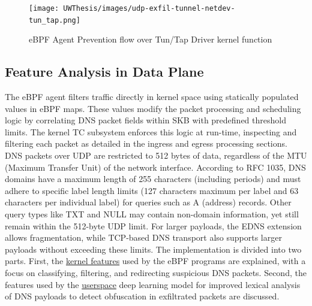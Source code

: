 \documentclass [11pt, proquest] {uwthesis}[2020/02/24]
\begin{document}
\begin{figure}[H]
\texttt{[image: UWThesis/images/udp-exfil-tunnel-netdev-tun\_tap.png]}
\caption{eBPF Agent Prevention flow over Tun/Tap Driver kernel function}
\label{sec:data_plane_tunnel_netdev}
\end{figure}



\subsection{Feature Analysis in Data Plane}
\label{sec:features}
The eBPF agent filters traffic directly in kernel space using statically populated values in eBPF maps. These values modify the packet processing and scheduling logic by correlating DNS packet fields within SKB with predefined threshold limits. The kernel TC subsystem enforces this logic at run-time, inspecting and filtering each packet as detailed in the ingress and egress processing sections. DNS packets over UDP are restricted to 512 bytes of data, regardless of the MTU (Maximum Transfer Unit) of the network interface. According to RFC 1035, DNS domains have a maximum length of 255 characters (including periods) and must adhere to specific label length limits (127 characters maximum per label and 63 characters per individual label) for queries such as A (address) records. Other query types like TXT and NULL may contain non-domain information, yet still remain within the 512-byte UDP limit. For larger payloads, the EDNS extension allows fragmentation, while TCP-based DNS transport also supports larger payloads without exceeding these limits. The implementation is divided into two parts. First, the \hyperref[sec:kernel-features]{kernel features} used by the eBPF programs are explained, with a focus on classifying, filtering, and redirecting suspicious DNS packets. Second, the features used by the \hyperref[sec:userspace-features]{userspace} deep learning model for improved lexical analysis of DNS payloads to detect obfuscation in exfiltrated packets are discussed.
\end{document}
